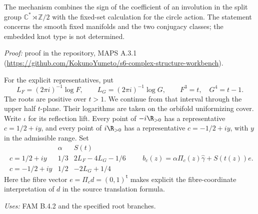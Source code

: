 The mechanism combines the sign of the coefficient of an involution in the split group $\mathbb C^*\rtimes\mathbb Z/2$ with the fixed-set calculation for the circle action. The statement concerns the smooth fixed manifolds and the two conjugacy classes; the embedded knot type is not determined.

\noindent\emph{Proof:} proof in the repository, MAPS A.3.1 (\url{https://github.com/KokunoYumeto/s6-complex-structure-workbench}).

\begin{definition}\label{maps:A.3.representatives}
For the explicit representatives, put
\[
 L_F=(2\pi i)^{-1}\log F,\qquad L_G=(2\pi i)^{-1}\log G,
 \qquad F^3=t,\quad G^4=t-1.
 \tag{MAPS A.3.1}
\]
The roots are positive over $t>1$. We continue from that interval
through the upper half $t$-plane. Their logarithms are taken on the
orbifold uniformizing cover. Write $\iota$ for its reflection lift.
Every point of $-i\R_{>0}$ has a representative $c=1/2+iy$, and every
point of $i\R_{>0}$ has a representative $c=-1/2+iy$, with $y$ in the
admissible range. Set
\[
\begin{array}{c|c|c}
 &\alpha&S(t)\\\hline
 c=1/2+iy&1/3&2L_F-4L_G-1/6\\
 c=-1/2+iy&1/2&-2L_G+1/4
\end{array}
\qquad b_c(z)=\alpha\Pi_c(z)\widehat\gamma+S(t(z))e.
\tag{MAPS A.3.2}
\]
Here the fibre vector $e=\Pi_c d=(0,1)^{\mathsf t}$ makes explicit the fibre-coordinate interpretation of $d$ in the source translation formula.
\end{definition}
\noindent\emph{Uses:} FAM B.4.2 and the specified root branches.\par

